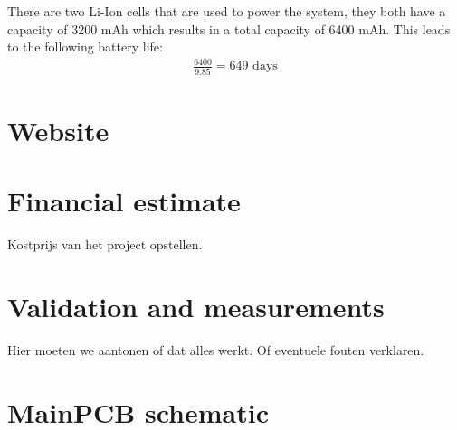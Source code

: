 \documentclass[11pt,a4paper]{article}
\begin{document}
There are two Li-Ion cells that are used to power the system, they both have a capacity of 3200 mAh which results in a total capacity of 6400 mAh. This leads to the following battery life:
\begin{gather*}
	\frac{6400}{9.85}=649 \text{ days}
\end{gather*}


\section{Website}

\section{Financial estimate}
Kostprijs van het project opstellen.

\section{Validation and measurements}
Hier moeten we aantonen of dat alles werkt. Of eventuele fouten verklaren.

\newpage
	

\newpage
\appendix
\section{MainPCB schematic}\label{app:mainpcb_schematic}


\newpage
\end{document}
